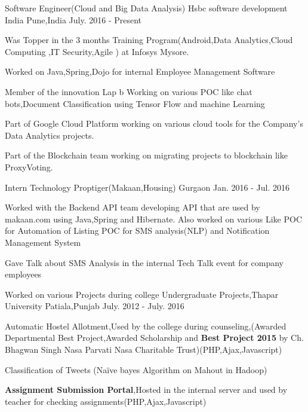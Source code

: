 \begin{cventries}
  \cventry
    {Software Engineer(Cloud and Big Data Analysis)}
    {Hsbc software development India}
    {Pune,India}
    {July. 2016 - Present}
    {
      \begin{cvitems}
        \item {Was Topper in the 3 months Training Program(Android,Data Analytics,Cloud Computing ,IT Security,Agile ) at Infosys Mysore.}
        \item {Worked on Java,Spring,Dojo for internal Employee Management Software}
        \item {Member of the innovation Lap b Working on various POC like chat bots,Document Classification using Tensor Flow and machine Learning}
        \item {
        Part of Google Cloud Platform working on various cloud tools for the Company's Data Analytics projects.
        }
        \item{
        Part of the Blockchain team working on migrating projects to blockchain like ProxyVoting.
        }
      \end{cvitems}
    }
  \cventry
    {Intern Technology}
    {Proptiger(Makaan,Housing)}
    {Gurgaon}
    {Jan. 2016 - Jul. 2016}
    {
      \begin{cvitems}
        \item {Worked with the Backend API team developing API that are used by makaan.com using Java,Spring and Hibernate.
Also worked on various Like POC for Automation of Listing
POC for SMS analysis(NLP) and Notification Management System}
        \item {Gave Talk about SMS Analysis in the internal Tech Talk event for company employees}
      \end{cvitems}
    }
  \cventry
    {Worked on various Projects during college}
    {Undergraduate Projects,Thapar University}
    {Patiala,Punjab}
    {July. 2012 - July. 2016}
    {
      \begin{cvitems}
        \item {Automatic Hostel Allotment,Used by the college during counseling,(Awarded Departmental Best Project,Awarded Scholarship and \textbf{Best Project 2015} by Ch. Bhagwan Singh Nasa Parvati Nasa Charitable Trust)(PHP,Ajax,Javascript)}
        \item {Classification of Tweets (Naïve bayes Algorithm on Mahout in Hadoop)}
        \item {\textbf{Assignment Submission Portal},Hosted in the internal server and used by teacher for checking assignments(PHP,Ajax,Javascript)}

\end{cvitems}}
\end{cventries}
